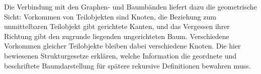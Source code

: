Die Verbindung mit den Graphen- und Baumbänden liefert dazu die
geometrische Sicht: Vorkommen von Teilobjekten sind Knoten, die Beziehung
zum unmittelbaren Teilobjekt gibt gerichtete Kanten, und das Vergessen
ihrer Richtung gibt den zugrunde liegenden ungerichteten Baum.
Verschiedene Vorkommen gleicher Teilobjekte bleiben dabei verschiedene
Knoten. Die hier bewiesenen Strukturgesetze erklären, welche Information
die geordnete und beschriftete Baumdarstellung für spätere rekursive
Definitionen bewahren muss.
